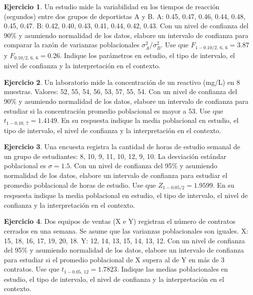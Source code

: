 \documentclass[
  11pt,
]{book}
\theoremstyle{definition}
\theoremstyle{definition}
\theoremstyle{definition}
\newtheorem{exercise}{Ejercicio}[chapter]
\theoremstyle{definition}
\theoremstyle{remark}
\begin{document}
\begin{exercise}
Un estudio mide la variabilidad en los tiempos de reacción (segundos) entre dos grupos de deportistas A y B. A: 0.45, 0.47, 0.46, 0.44, 0.48, 0.45, 0.47. B: 0.42, 0.40, 0.43, 0.41, 0.44, 0.42, 0.43. Con un nivel de confianza del 90\% y asumiendo normalidad de los datos, elabore un intervalo de confianza para comparar la razón de varianzas poblacionales \(\sigma_A^2/\sigma_B^2\). Use que \(F_{1-0.10/2,\,6,\,6} = 3.87\) y \(F_{0.10/2,\,6,\,6} = 0.26\). Indique los parámetros en estudio, el tipo de intervalo, el nivel de confianza y la interpretación en el contexto.
\end{exercise}

\begin{exercise}
Un laboratorio mide la concentración de un reactivo (mg/L) en 8 muestras. Valores: 52, 55, 54, 56, 53, 57, 55, 54. Con un nivel de confianza del 90\% y asumiendo normalidad de los datos, elabore un intervalo de confianza para estudiar si la concentración promedio poblacional es mayor a 53. Use que \(t_{1-0.10,\,7} = 1.4149\). En su respuesta indique la media poblacional en estudio, el tipo de intervalo, el nivel de confianza y la interpretación en el contexto.
\end{exercise}

\begin{exercise}
Una encuesta registra la cantidad de horas de estudio semanal de un grupo de estudiantes: 8, 10, 9, 11, 10, 12, 9, 10. La desviación estándar poblacional es \(\sigma = 1.5\). Con un nivel de confianza del 95\% y asumiendo normalidad de los datos, elabore un intervalo de confianza para estudiar el promedio poblacional de horas de estudio. Use que \(Z_{1-0.05/2} = 1.9599\). En su respuesta indique la media poblacional en estudio, el tipo de intervalo, el nivel de confianza y la interpretación en el contexto.
\end{exercise}

\begin{exercise}
Dos equipos de ventas (X e Y) registran el número de contratos cerrados en una semana. Se asume que las varianzas poblacionales son iguales. X: 15, 18, 16, 17, 19, 20, 18. Y: 12, 14, 13, 15, 14, 13, 12. Con un nivel de confianza del 95\% y asumiendo normalidad de los datos, elabore un intervalo de confianza para estudiar si el promedio poblacional de X supera al de Y en más de 3 contratos. Use que \(t_{1-0.05,\,12} = 1.7823\). Indique las medias poblacionales en estudio, el tipo de intervalo, el nivel de confianza y la interpretación en el contexto.
\end{exercise}
\end{document}
